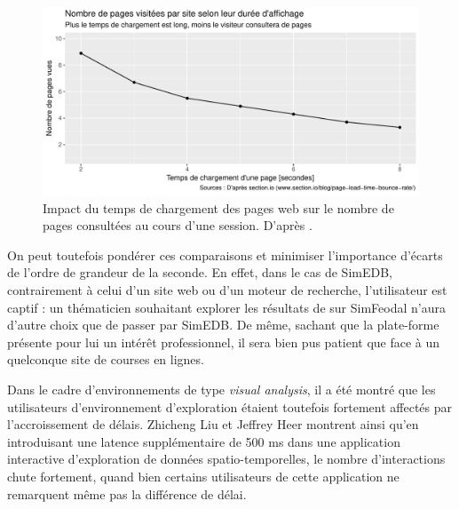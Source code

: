 			\begin{figure}[H]
				\centering
				\includegraphics[width=\linewidth]{img/abandon_pages.pdf}
				\caption{Impact du temps de chargement des pages web sur le nombre de pages consultées au cours d'une session. D'après \cite{elliott_how_2017}.}
				\label{fig:page-abandon}
			\end{figure}

			On peut toutefois pondérer ces comparaisons et minimiser l'importance d'écarts de l'ordre de grandeur de la seconde.
			En effet, dans le cas de SimEDB, contrairement à celui d'un site web ou d'un moteur de recherche, l'utilisateur est captif : un thématicien souhaitant explorer les résultats de sur SimFeodal n'aura d'autre choix que de passer par SimEDB.
			De même, sachant que la plate-forme présente pour lui un intérêt professionnel, il sera bien pus patient que face à un quelconque site de courses en lignes.

			Dans le cadre d'environnements de type \textit{visual analysis}, il a été montré que les utilisateurs d'environnement d'exploration étaient toutefois fortement affectés par l'accroissement de délais.
			Zhicheng Liu et Jeffrey Heer \autocite{liu_effects_2014} montrent ainsi qu'en introduisant une latence supplémentaire de 500 ms dans une application interactive d'exploration de données spatio-temporelles, le nombre d'interactions chute fortement, quand bien certains utilisateurs de cette application ne remarquent même pas la différence de délai.

			\paragraph*{}

